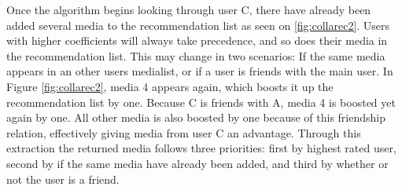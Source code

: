 Once the algorithm begins looking through user C, there have already been added several media to the recommendation list as seen on \ref{fig:collarec2}. Users with higher coefficients will always take precedence, and so does their media in the recommendation list. This may change in two scenarios: If the same media appears in an other users medialist, or if a user is friends with the main user. In Figure \ref{fig:collarec2}, media 4 appears again, which boosts it up the recommendation list by one. Because C is friends with A, media 4 is boosted yet again by one. All other media is also boosted by one because of this friendship relation, effectively giving media from user C an advantage. Through this extraction the returned media follows three priorities: first by highest rated user, second by if the same media have already been added, and third by whether or not the user is a friend.